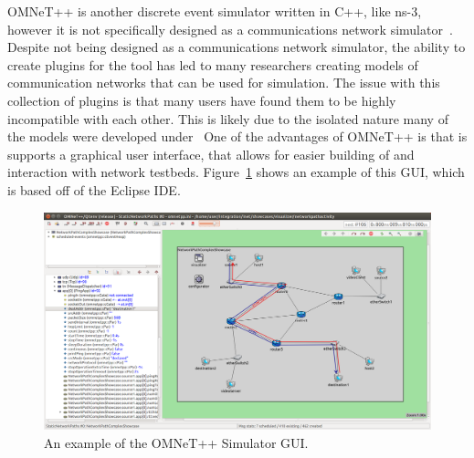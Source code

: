 OMNeT++ is another discrete event simulator written in C++, like ns-3, however it is not specifically designed as a communications network simulator~\cite{omnet++}.
Despite not being designed as a communications network simulator, the ability to create plugins for the tool has led to many researchers creating models of communication networks that can be used for simulation.
The issue with this collection of plugins is that many users have found them to be highly incompatible with each other. This is likely due to the isolated nature many of the models were developed under~\cite{tool_survey}
One of the advantages of OMNeT++ is that is supports a graphical user interface, that allows for easier building of and interaction with network testbeds.
Figure~\ref{omnet_gui} shows an example of this GUI, which is based off of the Eclipse IDE.\par

\begin{figure}[!ht]
    \centering
    \includegraphics[width=\textwidth,keepaspectratio]{Images/Chpt2/omnet_gui.png}
    \caption{An example of the OMNeT++ Simulator GUI.}
    \label{omnet_gui}
\end{figure}

